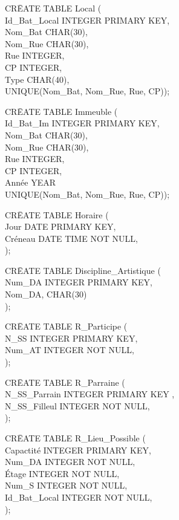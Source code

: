 \documentclass[a4paper,10.5pt]{report}
\begin{document}
		\begin{tabbing}
			CR\=EATE TABLE Local (\\
			\> Id\_Bat\_Local INTEGER PRIMARY KEY,\\
			\> Nom\_Bat CHAR(30),\\
			\> Nom\_Rue CHAR(30),\\
			\> Rue INTEGER,\\
			\> CP INTEGER,\\
			\> Type CHAR(40),\\
			\> UNIQUE(Nom\_Bat, Nom\_Rue, Rue, CP));
		\end{tabbing}
		\begin{tabbing}
			CR\=EATE TABLE Immeuble (\\
			\> Id\_Bat\_Im INTEGER PRIMARY KEY,\\
			\> Nom\_Bat CHAR(30),\\
			\> Nom\_Rue CHAR(30),\\
			\> Rue INTEGER,\\
			\> CP INTEGER,\\
			\> Année YEAR\\
			\> UNIQUE(Nom\_Bat, Nom\_Rue, Rue, CP));
		\end{tabbing}

		\begin{tabbing}
			CR\=EATE TABLE Horaire (\\
			\> Jour DATE PRIMARY KEY,\\
			\> Créneau DATE TIME NOT NULL,\\);
		\end{tabbing}
		\begin{tabbing}
			CR\=EATE TABLE Discipline\_Artistique (\\
			\> Num\_DA INTEGER PRIMARY KEY,\\
			\> Nom\_DA, CHAR(30)\\);
		\end{tabbing}
		\begin{tabbing}
			CR\=EATE TABLE R\_Participe (\\
			\> N\_SS INTEGER PRIMARY KEY,\\
			\> Num\_AT INTEGER NOT NULL,\\);
		\end{tabbing}
		\begin{tabbing}
			CR\=EATE TABLE R\_Parraine (\\
			\> N\_SS\_Parrain INTEGER PRIMARY KEY ,\\
			\> N\_SS\_Filleul INTEGER NOT NULL,\\);
		\end{tabbing}
		\begin{tabbing}
			CR\=EATE TABLE R\_Lieu\_Possible (\\
			\> Capactité INTEGER PRIMARY KEY,\\
			\> Num\_DA INTEGER NOT NULL,\\
			\> Étage INTEGER NOT NULL,\\
			\> Num\_S INTEGER NOT NULL,\\
			\> Id\_Bat\_Local INTEGER NOT NULL,\\);
		\end{tabbing}
\end{document}
